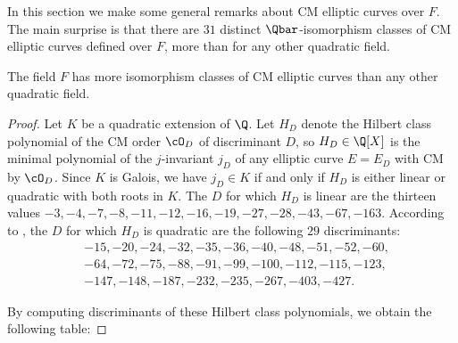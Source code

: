\documentclass{amsart}
\begin{document}
In this section we make some general remarks about CM elliptic curves
over $F$.  The main surprise is that there are $31$ distinct
$\Qbar$-isomorphism classes of CM elliptic curves defined over $F$,
more than for any other quadratic field.

\begin{proposition}
The field $F$ has more isomorphism classes of CM
elliptic curves than any other quadratic field.
\end{proposition}
\begin{proof}
Let $K$ be a quadratic extension of $\Q$.
Let $H_D$ denote the Hilbert class polynomial of the CM order
$\cO_D$ of discriminant $D$, so $H_D\in \Q[X]$ is the minimal
polynomial of the $j$-invariant $j_D$ of any elliptic curve $E=E_D$ with
CM by $\cO_D$.   Since $K$ is Galois, we have $j_D \in K$ if and only if
$H_D$ is either linear or quadratic with both roots in $K$.
The $D$ for which $H_D$ is linear are the thirteen values
$-3, -4, -7, -8, -11, -12, -16, -19, -27, -28, -43, -67, -163$.
According to \cite{cremona:abvar}, the
$D$ for which $H_D$ is quadratic are the following $29$
discriminants:
\begin{align*}
&-15, -20, -24, -32, -35, -36, -40, -48, -51, -52, -60, \\
&-64, -72, -75, -88, -91, -99, -100, -112, -115, -123, \\
&-147, -148, -187, -232, -235, -267, -403, -427.
\end{align*}
 
By computing discriminants of these Hilbert class polynomials,
we obtain the following table:



\end{proof}
\end{document}
